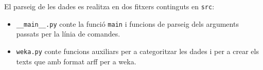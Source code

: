 
El parseig de les dades es realitza en dos fitxers continguts en \texttt{src}:
\begin{itemize}
	\item \verb|__main__.py| conte la funció \texttt{main} i funcions de parseig dels
	arguments passats per la línia de comandes.
	\item \texttt{weka.py} conte funcions auxiliars per a categoritzar les dades i per a crear els
	texts que amb format arff per a weka.
\end{itemize}
